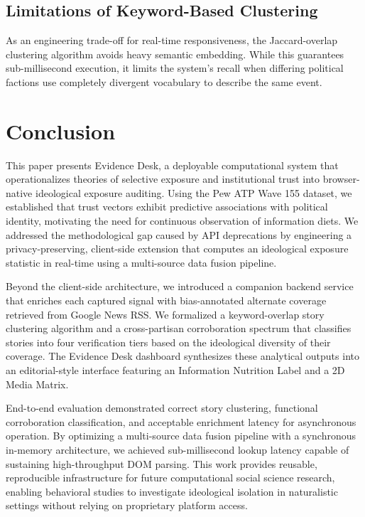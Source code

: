 \documentclass[10pt, conference, compsoc]{IEEEtran}
\begin{document}
\subsection{Limitations of Keyword-Based Clustering}
As an engineering trade-off for real-time responsiveness, the Jaccard-overlap clustering algorithm avoids heavy semantic embedding. While this guarantees sub-millisecond execution, it limits the system's recall when differing political factions use completely divergent vocabulary to describe the same event.


\section{Conclusion}
This paper presents Evidence Desk, a deployable computational system that operationalizes theories of selective exposure and institutional trust into browser-native ideological exposure auditing. Using the Pew ATP Wave 155 dataset, we established that trust vectors exhibit predictive associations with political identity, motivating the need for continuous observation of information diets. We addressed the methodological gap caused by API deprecations by engineering a privacy-preserving, client-side extension that computes an ideological exposure statistic in real-time using a multi-source data fusion pipeline.

Beyond the client-side architecture, we introduced a companion backend service that enriches each captured signal with bias-annotated alternate coverage retrieved from Google News RSS. We formalized a keyword-overlap story clustering algorithm and a cross-partisan corroboration spectrum that classifies stories into four verification tiers based on the ideological diversity of their coverage. The Evidence Desk dashboard synthesizes these analytical outputs into an editorial-style interface featuring an Information Nutrition Label and a 2D Media Matrix.

End-to-end evaluation demonstrated correct story clustering, functional corroboration classification, and acceptable enrichment latency for asynchronous operation. By optimizing a multi-source data fusion pipeline with a synchronous in-memory architecture, we achieved sub-millisecond lookup latency capable of sustaining high-throughput DOM parsing. This work provides reusable, reproducible infrastructure for future computational social science research, enabling behavioral studies to investigate ideological isolation in naturalistic settings without relying on proprietary platform access.
\end{document}
